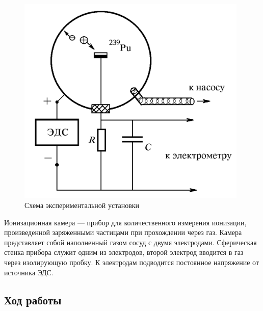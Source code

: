 \documentclass[a4paper,12pt]{article} %
\begin{document}
            \begin{figure}[h]
                \centering
                \includegraphics[width=11cm]{img/Ion.PNG}
                \caption{Схема экспериментальной установки}
                \label{fig1}
            \end{figure}
            Ионизационная камера — прибор для количественного измерения ионизации, произведенной заряженными частицами при прохождении через газ.
            Камера представляет собой наполненный газом сосуд с двумя электродами. 
            Сферическая стенка прибора служит одним из электродов, второй электрод вводится в газ через изолирующую пробку.
            К электродам подводится постоянное напряжение от источника ЭДС.\par

        \subsection{Ход работы}
\end{document}
